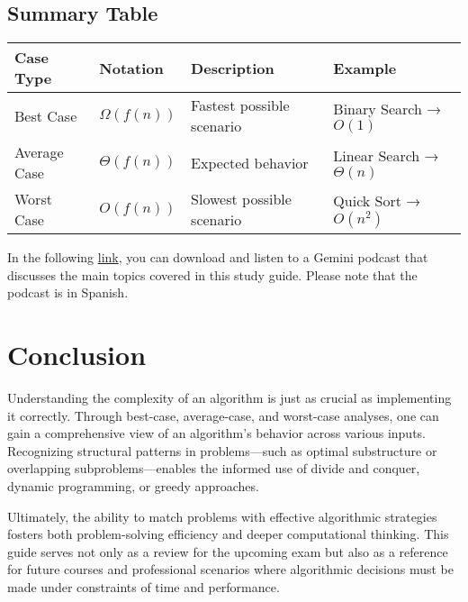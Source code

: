 \documentclass[12pt]{article}
\begin{document}
\subsection{Summary Table}

\begin{center}
    \begin{tabular}{@{}llll@{}}
        \toprule
        \textbf{Case Type} & \textbf{Notation} & \textbf{Description} & \textbf{Example} \\ \midrule
        Best Case   & \( \Omega(f(n)) \) & Fastest possible scenario & Binary Search → \( O(1) \) \\
        Average Case& \( \Theta(f(n)) \) & Expected behavior          & Linear Search → \( \Theta(n) \) \\
        Worst Case  & \( O(f(n)) \)      & Slowest possible scenario  & Quick Sort → \( O(n^2) \) \\
        \bottomrule
    \end{tabular}
\end{center}

In the following \href{https://github.com/aocalderon/PUJ/raw/refs/heads/main/2025-S1/ADA/StudyGuides/SG4/EscoguiendoElAlgoritmoApropiado.mp3}{link}, you can download and listen to a Gemini podcast that discusses the main topics covered in this study guide. Please note that the podcast is in Spanish.

\section*{Conclusion}
Understanding the complexity of an algorithm is just as crucial as implementing it correctly. Through best-case, average-case, and worst-case analyses, one can gain a comprehensive view of an algorithm’s behavior across various inputs. Recognizing structural patterns in problems—such as optimal substructure or overlapping subproblems—enables the informed use of divide and conquer, dynamic programming, or greedy approaches.

Ultimately, the ability to match problems with effective algorithmic strategies fosters both problem-solving efficiency and deeper computational thinking. This guide serves not only as a review for the upcoming exam but also as a reference for future courses and professional scenarios where algorithmic decisions must be made under constraints of time and performance.

\end{document}
